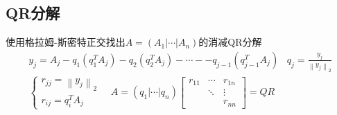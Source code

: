 \documentclass[twocolumn]{article}
\begin{document}
\subsection{QR分解}
使用格拉姆-斯密特正交找出$A=(A_1|\cdots|A_n)$的消减QR分解
\begin{align*}
    y_j=A_j-q_1(q_1^TA_j)-q_2(q_2^TA_j)-\cdots--q_{j-1}(q_{j-1}^TA_j) \,\,\,\,\, q_j=\frac{y_j}{\left\| y_j \right\|_2}\\
    \begin{cases}
        r_{jj}=\left\| y_j \right\|_2 \\
        r_{ij}=q_i^TA_j
    \end{cases}
    \quad
    A=(q_1|\cdots|q_n)
    \begin{bmatrix}
        r_{11} & \cdots & r_{1n} \\
               & \ddots & \vdots \\
               &        & r_{nn}
    \end{bmatrix}
    =QR
\end{align*}
\end{document}
